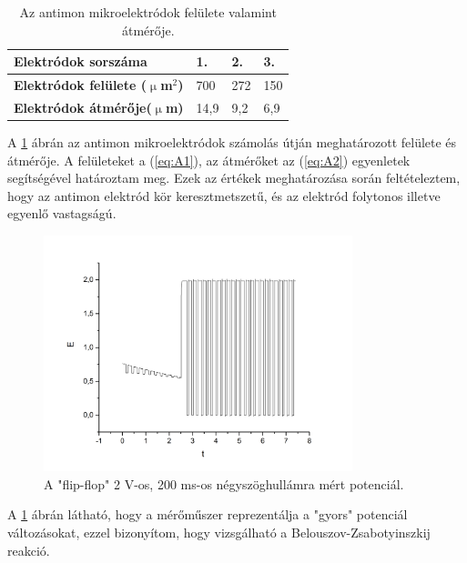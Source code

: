 \begin{table}[]
\centering
\caption{Az antimon mikroelektródok felülete valamint átmérője.}
\label{elektrodokfeluleteatmeroje}
\begin{tabular}{|l|l|l|l|}
\hline
\textbf{Elektródok sorszáma}           & 1.   & 2.  & 3.  \\ \hline
\textbf{Elektródok felülete ($\upmu$m$^2$)} & 700  & 272 & 150 \\ \hline
\textbf{Elektródok átmérője($\upmu$m)}   & 14,9 & 9,2 & 6,9 \\ \hline
\end{tabular}
\end{table}
A \ref{elektrodokfeluleteatmeroje} ábrán az antimon mikroelektródok számolás útján meghatározott felülete és átmérője. A felületeket a (\ref{eq:A1}), az átmérőket az (\ref{eq:A2}) egyenletek segítségével határoztam meg. Ezek az értékek meghatározása során feltételeztem, hogy az antimon elektród kör keresztmetszetű, és az elektród folytonos illetve egyenlő vastagságú.


\begin{figure}[h]
\centering
\includegraphics[width=0.8\textwidth]{img/square.jpg}
\caption{A "flip-flop" 2 V-os, 200 ms-os négyszöghullámra mért potenciál.}
\label{fig:square}
\end{figure}
A \ref{fig:square} ábrán látható, hogy a mérőműszer reprezentálja a "gyors" potenciál változásokat, ezzel bizonyítom, hogy vizsgálható a Belouszov-Zsabotyinszkij reakció.

